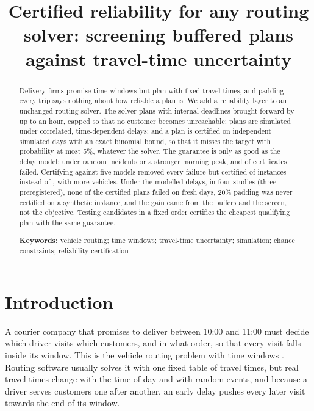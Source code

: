 \documentclass[11pt,a4paper]{article}
\title{Certified reliability for any routing solver: screening buffered plans
against travel-time uncertainty}
\author{}
\date{}
\theoremstyle{remark}
\begin{document}
\maketitle
\onehalfspacing

\begin{abstract}
\noindent Delivery firms promise time windows but plan with fixed travel times, and
padding every trip says nothing about how reliable a plan is. We add a reliability
layer to an unchanged routing solver. The solver plans
with internal deadlines brought forward by up to an hour, capped so that no customer
becomes unreachable; plans are simulated under correlated, time-dependent delays; and
a plan is certified on independent simulated days with an exact binomial bound, so
that it misses the target with probability at most 5\%, whatever the solver. The
guarantee is only as good as the delay model: under random incidents or a stronger
morning peak, \WrIncFailed{} and \WrPeakFailed{} of \WrIncCert{} certificates failed.
Certifying against five models removed every failure but certified \StOStress{} of
\StOInst{} instances instead of \StOSingle{}, with \StOFleet{} more vehicles. Under the
modelled delays, in four studies (three preregistered), none of the \CertTotal{}
certified plans failed on fresh days, 20\% padding was never certified on a synthetic
instance, and the gain came from the buffers and the screen, not the objective.
Testing candidates in a fixed order certifies the cheapest qualifying plan with the
same guarantee.

\medskip\noindent\textbf{Keywords:} vehicle routing; time windows; travel-time
uncertainty; simulation; chance constraints; reliability certification
\end{abstract}

\section{Introduction}

A courier company that promises to deliver between 10:00 and 11:00 must decide
which driver visits which customers, and in what order, so that every visit falls
inside its window. This is the vehicle routing problem with time windows
\citep[VRPTW;][]{solomon1987,toth2014}. Routing software usually solves it with one
fixed table of travel times, but real travel times change with the time of day and
with random events, and because a driver serves customers one after another, an
early delay pushes every later visit towards the end of its window.
\end{document}
